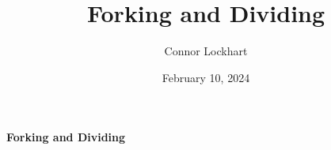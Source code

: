 \documentclass[a4paper]{article}
\title{Forking and Dividing}
\date{February 10, 2024}
\author{Connor Lockhart}
\begin{document}
\maketitle
\par{\textbf{Forking and Dividing}}
\printbibliography
\end{document}
